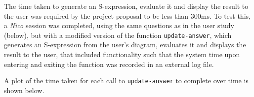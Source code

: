 \documentclass[12pt,twoside,notitlepage,xetex]{report}
\begin{document}
The time taken to generate an S-expression, evaluate it and display the result to the user was required by the project proposal to be less than 300ms.  To test this, a \emph{Nico} session was completed, using the same questions as in the user study (below), but with a modified version of the function \verb¬update-answer¬, which generates an S-expression from the user's diagram, evaluates it and displays the result to the user, that included functionality such that the system time upon entering and exiting the function was recorded in an external log file.

A plot of the time taken for each call to \verb¬update-answer¬ to complete over time is shown below.

\begin{center}
\begin{figure}[H]
\begin{center}
\\
\subfloat[]{
}
\end{center}
\end{figure}
\end{center}
\end{document}
